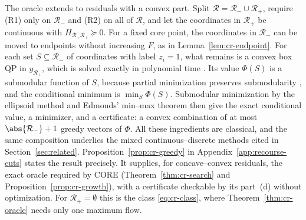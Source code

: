 \begin{remark}\label{rem:cr-mixed}
The oracle extends to residuals with a convex part. Split
$\mathcal R=\mathcal R_-\cup\mathcal R_+$, require (R1) only on $\mathcal R_-$
and (R2) on all of $\mathcal R$, and let the coordinates in $\mathcal R_+$
be continuous with $H_{\mathcal R_+\mathcal R_+}\succeq0$. For a fixed core
point, the coordinates in $\mathcal R_-$ can be moved to endpoints without
increasing $F$, as in Lemma~\ref{lem:cr-endpoint}. For each set
$S\subseteq\mathcal R_-$ of coordinates with label $z_i=1$, what remains is a
convex box QP in $y_{\mathcal R_+}$, which is solved exactly in polynomial
time \cite{KozlovTarasovKhachiyan1980}. Its value $\Phi(S)$ is a submodular
function of $S$, because partial minimization preserves submodularity
\cite{Topkis1978}, and the conditional minimum is $\min_S\Phi(S)$.
Submodular minimization by the ellipsoid method
\cite{GrotschelLovaszSchrijver1988} and Edmonds' min--max theorem
\cite{Edmonds1970} then give the exact conditional value, a minimizer, and a
certificate: a convex combination of at most $\abs{\mathcal R_-}+1$ greedy
vectors of $\Phi$. All these ingredients are classical, and the same
composition underlies the mixed continuous--discrete methods cited in
Section~\ref{sec:related}.
Proposition~\ref{prop:cr-greedy} in Appendix~\ref{app:recourse-cuts} states
the result precisely. It supplies, for concave--convex residuals, the exact
oracle required by CORE (Theorem~\ref{thm:cr-search} and
Proposition~\ref{prop:cr-growth}), with a certificate checkable by its
part~(d) without optimization. For $\mathcal R_+=\emptyset$ this is the class
\eqref{eq:cr-class}, where Theorem~\ref{thm:cr-oracle} needs only one
maximum flow.
\end{remark}
